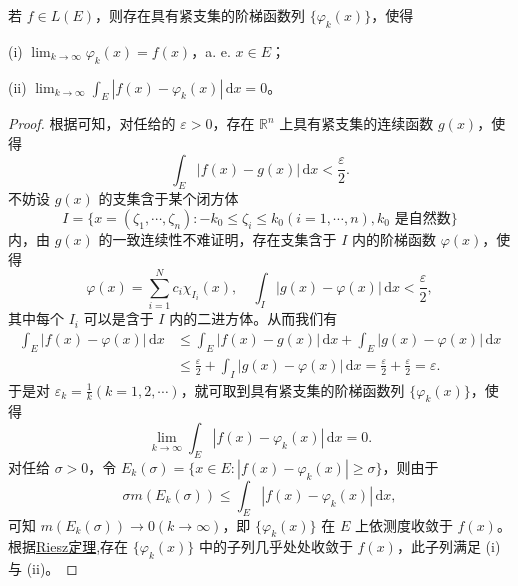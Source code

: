 \documentclass[../../main.tex]{subfiles}%
\begin{document}
\begin{corollary}\label{corollary:推论4.22}
若 \( f \in L(E) \)，则存在具有紧支集的阶梯函数列 \( \{\varphi_k(x)\} \)，使得

(i) \( \lim_{k \to \infty} \varphi_k(x) = f(x) \)，a. e. \( x \in E \)；

(ii) \( \lim_{k \to \infty} \int_E |f(x) - \varphi_k(x)| \, \mathrm{d}x = 0 \)。
\end{corollary}
\begin{proof}
根据可知，对任给的 \( \varepsilon > 0 \)，存在 \( \mathbb{R}^n \) 上具有紧支集的连续函数 \( g(x) \)，使得
\[
\int_E |f(x) - g(x)| \, \mathrm{d}x < \frac{\varepsilon}{2}.
\]
不妨设 \( g(x) \) 的支集含于某个闭方体
\[
I = \{ x = (\zeta_1, \cdots, \zeta_n) : -k_0 \leqslant \zeta_i \leqslant k_0 (i = 1, \cdots, n), k_0 \text{ 是自然数} \}
\]
内，由 \( g(x) \) 的一致连续性不难证明，存在支集含于 \( I \) 内的阶梯函数 \( \varphi(x) \)，使得
\[
\varphi(x) = \sum_{i=1}^N c_i \chi_{I_i}(x), \quad \int_I |g(x) - \varphi(x)| \, \mathrm{d}x < \frac{\varepsilon}{2},
\]
其中每个 \( I_i \) 可以是含于 \( I \) 内的二进方体。从而我们有
\begin{align*}
\int_E |f(x) - \varphi(x)| \, \mathrm{d}x &\leqslant \int_E |f(x) - g(x)| \, \mathrm{d}x + \int_E |g(x) - \varphi(x)| \, \mathrm{d}x \\
&\leqslant \frac{\varepsilon}{2} + \int_I |g(x) - \varphi(x)| \, \mathrm{d}x = \frac{\varepsilon}{2} + \frac{\varepsilon}{2} = \varepsilon.
\end{align*}
于是对 \( \varepsilon_k = \frac{1}{k} (k = 1, 2, \cdots) \)，就可取到具有紧支集的阶梯函数列 \( \{\varphi_k(x)\} \)，使得
\[
\lim_{k \to \infty} \int_E |f(x) - \varphi_k(x)| \, \mathrm{d}x = 0.
\]
对任给 \( \sigma > 0 \)，令 \( E_k(\sigma) = \{ x \in E : |f(x) - \varphi_k(x)| \geqslant \sigma \} \)，则由于
\[
\sigma m(E_k(\sigma)) \leqslant \int_E |f(x) - \varphi_k(x)| \, \mathrm{d}x,
\]
可知 \( m(E_k(\sigma)) \to 0 (k \to \infty) \)，即 \( \{\varphi_k(x)\} \) 在 \( E \) 上依测度收敛于 \( f(x) \)。
根据\hyperref[theorem:Riesz定理]{Riesz定理},存在 \( \{\varphi_k(x)\} \) 中的子列几乎处处收敛于 \( f(x) \)，此子列满足 (i) 与 (ii)。
\end{proof}
\end{document}

